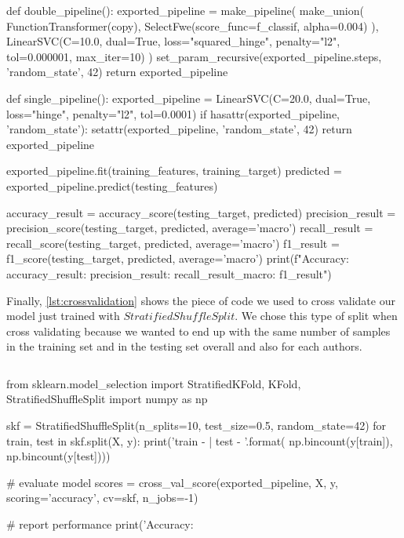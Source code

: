 \begin{lstlisting}[frame=none,caption={Training SVM model and retrieve score metrics},captionpos=b,label=lst:train_svm]
\end{lstlisting}
\begin{python}	
	def double_pipeline():
		exported_pipeline = make_pipeline(
		make_union(
		FunctionTransformer(copy),
		SelectFwe(score_func=f_classif, alpha=0.004)
		),
		LinearSVC(C=10.0, dual=True, loss="squared_hinge", penalty="l2", tol=0.000001, max_iter=10)
		)
		set_param_recursive(exported_pipeline.steps, 'random_state', 42)
		return exported_pipeline
	
	def single_pipeline():
		exported_pipeline = LinearSVC(C=20.0, dual=True, loss="hinge", penalty="l2", tol=0.0001)
		if hasattr(exported_pipeline, 'random_state'):
			setattr(exported_pipeline, 'random_state', 42)
		return exported_pipeline
	
	exported_pipeline.fit(training_features, training_target)
	predicted = exported_pipeline.predict(testing_features)
	
	accuracy_result = accuracy_score(testing_target, predicted)
	precision_result = precision_score(testing_target, predicted, average='macro')
	recall_result = recall_score(testing_target, predicted, average='macro')
	f1_result = f1_score(testing_target, predicted, average='macro')
	print(f"Accuracy: {accuracy_result}\nPrecision: {precision_result}\nRecall: {recall_result}_macro: {f1_result}")
\end{python}

Finally, \autoref{lst:crossvalidation} shows the piece of code we used to cross validate our model just trained with $StratifiedShuffleSplit$. We chose this type of split when cross validating because we wanted to end up with the same number of samples in the training set and in the testing set overall and also for each authors.

\begin{lstlisting}[frame=none,caption={Cross validation for balanced class.},captionpos=b,label=lst:crossvalidation]
\end{lstlisting}
\begin{python}	
	from sklearn.model_selection import StratifiedKFold, KFold, StratifiedShuffleSplit
	import numpy as np
	
	skf = StratifiedShuffleSplit(n_splits=10, test_size=0.5, random_state=42)
	for train, test in skf.split(X, y):
		print('train -  {}   |   test -  {}'.format(
		np.bincount(y[train]), np.bincount(y[test])))
	
	
	# evaluate model
	scores = cross_val_score(exported_pipeline, X, y, scoring='accuracy', cv=skf, n_jobs=-1)
	
	# report performance
	print('Accuracy: %
\end{python}


